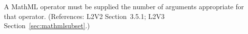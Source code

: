 A MathML operator must be supplied the number of arguments appropriate for
that operator.  (References: L2V2 Section~3.5.1; L2V3
Section~\ref{sec:mathmlsubset}.)
